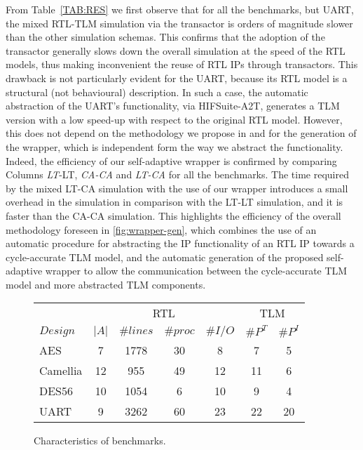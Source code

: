 From Table~\ref{TAB:RES} we first observe that for all the benchmarks, but UART, the mixed RTL-TLM simulation via the transactor is orders of magnitude slower than the other simulation schemas. This confirms that the adoption of the transactor generally slows down the overall simulation at the speed of the RTL models, thus making inconvenient the reuse of RTL IPs through transactors. 
This drawback is not particularly evident for the UART, because its RTL model is a structural (not behavioural) description. In such a case, the automatic abstraction of the UART's functionality, via HIFSuite-A2T, generates a TLM version with a low speed-up with respect to the original RTL model. However, this does not depend on the methodology we propose in  and  for the generation of the wrapper, which is independent form the way we abstract the functionality.
Indeed, the efficiency of our self-adaptive wrapper is confirmed by comparing Columns \textit{LT}-LT, \textit{CA-CA} and \textit{LT-CA} for all the benchmarks. The time required by the mixed LT-CA simulation with the use of our wrapper introduces a small overhead in the simulation in comparison with the  LT-LT simulation, and it is faster than the  CA-CA simulation.
This highlights the efficiency of the overall methodology foreseen in \ref{fig:wrapper-gen}, which combines the use of an automatic procedure for abstracting the IP functionality of an RTL IP towards a cycle-accurate TLM model, and the automatic generation of the proposed self-adaptive wrapper to allow the communication between the cycle-accurate TLM model and more abstracted TLM components.



\begin{figure}[h!]
\centering
\begin{tabular}{ l || c |c |c |c ||c| c|| }
\multicolumn{1}{l||}{} & 
\multicolumn{4}{c||}{RTL} & 
\multicolumn{2}{c||}{TLM} \\
$Design$	&	
$|A|$		&	
$\#lines$	&	
$\#proc$	&
$\#I/O$	&
 $\#P^T$	&	
 $\#P^I$\\
\hline
\hline
AES			&	7		&	1778	&	30 	&	8 	& 	7 	&	5	\\
Camellia	&	12		&	955		&	49	&	12	&	11	&	6	\\
DES56 		&	10		&	1054	&	6	&	10	&	9	&	4	\\
UART		&	9		&	3262	&	60	&	23	&	22	&	20\\
\end{tabular}
\vspace{0.1cm}
\caption{Characteristics of benchmarks.}
\label{TAB:DESIGN}
\end{figure}

